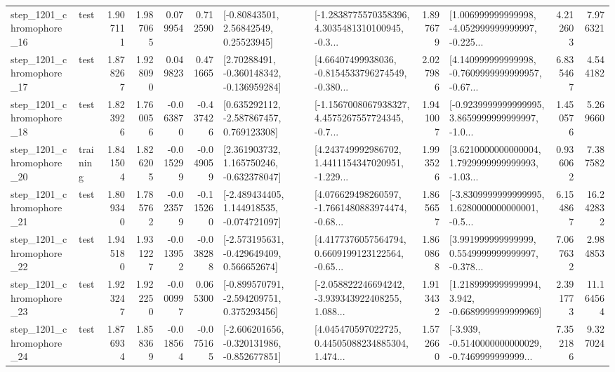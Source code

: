 \begin{tabular}{llrrrrllrlrr}
 step\_1201\_chromophore\_16 &      test &      1.907111 &    1.987065 &      0.079954 &  0.712590 &       [-0.80843501, 2.56842549, 0.25523945] &  [-1.2838775570358396, 4.3035481310100945, -0.3... &       1.897679 &  [1.006999999999998, -4.052999999999997, -0.225... &            4.212603 &          7.976321 \\
 step\_1201\_chromophore\_17 &      test &      1.878267 &    1.928090 &      0.049823 &  0.471665 &    [2.70288491, -0.360148342, -0.136959284] &  [4.66407499938036, -0.8154533796274549, -0.380... &       2.027986 &  [4.140999999999998, -0.7609999999999957, -0.67... &            6.835467 &          4.544182 \\
 step\_1201\_chromophore\_18 &      test &      1.823926 &    1.760056 &     -0.063870 & -0.437426 &    [0.635292112, -2.587867457, 0.769123308] &  [-1.1567008067938327, 4.4575267557724345, -0.7... &       1.941007 &  [-0.9239999999999995, 3.8659999999999997, -1.0... &            1.450576 &          5.269660 \\
 step\_1201\_chromophore\_20 &  training &      1.841504 &    1.826205 &     -0.015299 & -0.049059 &    [2.361903732, 1.165750246, -0.632378047] &  [4.243749992986702, 1.4411154347020951, -1.229... &       1.993526 &  [3.6210000000000004, 1.7929999999999993, -1.03... &            0.936062 &          7.387582 \\
 step\_1201\_chromophore\_21 &      test &      1.809340 &    1.785762 &     -0.023579 & -0.115260 &   [-2.489434405, 1.144918535, -0.074721097] &  [4.076629498260597, -1.7661480883974474, -0.68... &       1.865657 &  [-3.8309999999999995, 1.6280000000000001, -0.5... &            6.154867 &         16.242832 \\
 step\_1201\_chromophore\_22 &      test &      1.945180 &    1.931227 &     -0.013952 & -0.038288 &   [-2.573195631, -0.429649409, 0.566652674] &  [4.4177376057564794, 0.6609199123122564, -0.65... &       1.860868 &  [3.991999999999999, 0.5549999999999997, -0.378... &            7.067632 &          2.984853 \\
 step\_1201\_chromophore\_23 &      test &      1.923247 &    1.922250 &     -0.000997 &  0.065300 &   [-0.899570791, -2.594209751, 0.375293456] &  [-2.058822246694242, -3.939343922408255, 1.088... &       1.913432 &   [1.2189999999999994, 3.942, -0.6689999999999969] &            2.391773 &         11.164564 \\
 step\_1201\_chromophore\_24 &      test &      1.876934 &    1.858369 &     -0.018564 & -0.075165 &  [-2.606201656, -0.320131986, -0.852677851] &  [4.045470597022725, 0.44505088234885304, 1.474... &       1.572660 &  [-3.939, -0.5140000000000029, -0.7469999999999... &            7.352186 &          9.327024 \\

\end{tabular}
